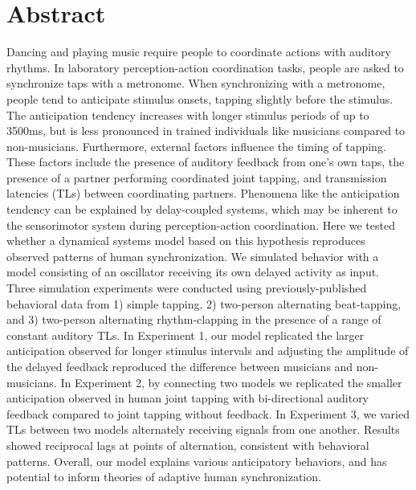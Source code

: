 \documentclass{report}
\begin{document}
\section{Abstract}
Dancing and playing music require people to coordinate actions with auditory rhythms. In laboratory perception-action coordination tasks, people are asked to synchronize taps with a metronome. When synchronizing with a metronome, people tend to anticipate stimulus onsets, tapping slightly before the stimulus. The anticipation tendency increases with longer stimulus periods of up to 3500ms, but is less pronounced in trained individuals like musicians compared to non-musicians. Furthermore, external factors influence the timing of tapping. These factors include the presence of auditory feedback from one’s own taps, the presence of a partner performing coordinated joint tapping, and transmission latencies (TLs) between coordinating partners. Phenomena like the anticipation tendency can be explained by delay-coupled systems, which may be inherent to the sensorimotor system during perception-action coordination. Here we tested whether a dynamical systems model based on this hypothesis reproduces observed patterns of human synchronization. We simulated behavior with a model consisting of an oscillator receiving its own delayed activity as input. Three simulation experiments were conducted using previously-published behavioral data from 1) simple tapping, 2) two-person alternating beat-tapping, and 3) two-person alternating rhythm-clapping in the presence of a range of constant auditory TLs. In Experiment 1, our model replicated the larger anticipation observed for longer stimulus intervals and adjusting the amplitude of the delayed feedback reproduced the difference between musicians and non-musicians. In Experiment 2, by connecting two models we replicated the smaller anticipation observed in human joint tapping with bi-directional auditory feedback compared to joint tapping without feedback. In Experiment 3, we varied TLs between two models alternately receiving signals from one another. Results showed reciprocal lags at points of alternation, consistent with behavioral patterns. Overall, our model explains various anticipatory behaviors, and has potential to inform theories of adaptive human synchronization.
\end{document}
